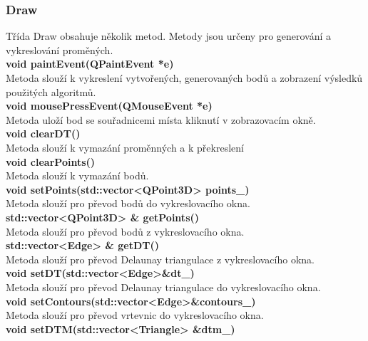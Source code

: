 \documentclass[a4paper, 12pt]{article}
\begin{document}
\subsubsection{Draw}
Třída Draw obsahuje několik metod. Metody jsou určeny pro generování a vykreslování proměných.
\\

\textbf{void paintEvent(QPaintEvent *e)}\\
Metoda slouží k vykreslení vytvořených, generovaných bodů a zobrazení výsledků použitých algoritmů.
\\

\textbf{void mousePressEvent(QMouseEvent *e)}\\
Metoda uloží bod se souřadnicemi místa kliknutí v zobrazovacím okně.
\\

\textbf{void clearDT()}\\
Metoda slouží k vymazání proměnných a k překreslení
\\

\textbf{void clearPoints()}\\
Metoda slouží k vymazání bodů.
\\

\textbf{void setPoints(std::vector<QPoint3D> points\_)}\\
Metoda slouží pro převod bodů do vykreslovacího okna.\\

\textbf{std::vector<QPoint3D> \& getPoints()}\\
Metoda slouží pro převod bodů z vykreslovacího okna.\\

\textbf{std::vector<Edge> \& getDT()}\\
Metoda slouží pro převod Delaunay triangulace z vykreslovacího okna.\\

\textbf{void setDT(std::vector<Edge>\&dt\_)}\\
Metoda slouží pro převod Delaunay triangulace do vykreslovacího okna.\\

\textbf{void setContours(std::vector<Edge>\&contours\_)}\\
Metoda slouží pro převod vrtevnic do vykreslovacího okna.\\

\textbf{void setDTM(std::vector<Triangle> \&dtm\_)}\\
\\
\end{document}
